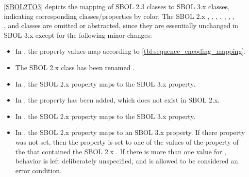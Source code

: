 \ref{SBOL2TO3} depicts the mapping of SBOL 2.3 classes to SBOL 3.x classes, indicating corresponding classes/properties by color.   
The SBOL 2.x , , , , , , , \\
, and  classes are omitted or abstracted, since they are essentially unchanged in SBOL 3.x except for the following minor changes:
\begin{itemize}
\item In , the  property values map according to  \ref{tbl:sequence_encoding_mapping}. 
\item The SBOL 2.x  class has been renamed .
\item In , the SBOL 2.x  property maps to the SBOL 3.x  property.
\item In , the  property has been added, which does not exist in SBOL 2.x.
\item In , the SBOL 2.x  property maps to the SBOL 3.x  property.
\item In , the SBOL 2.x  property maps to an SBOL 3.x  property. 
If there  property was not set, then the  property is set to one of the values of the  property of the  that contained the SBOL 2.x .
If there is more than one value for , behavior is left deliberately unspecified, and is allowed to be considered an error condition.
\end{itemize}

